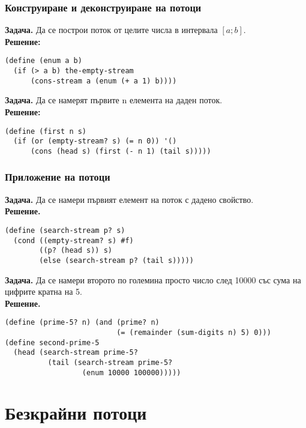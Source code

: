\documentclass{beamer}
\begin{document}
\begin{frame}[fragile]
  \frametitle{Конструиране и деконструиране на потоци}

  \textbf{Задача.} Да се построи поток от целите числа в интервала $[a; b]$.\\
  \pause
  \textbf{Решение:}
\begin{verbatim}
(define (enum a b)
  (if (> a b) the-empty-stream
      (cons-stream a (enum (+ a 1) b))))
\end{verbatim}
  \pause
  \textbf{Задача.} Да се намерят първите n елемента на даден поток.\\
  \pause
  \textbf{Решение:}
\begin{verbatim}
(define (first n s)
  (if (or (empty-stream? s) (= n 0)) '()
      (cons (head s) (first (- n 1) (tail s)))))
\end{verbatim}
\end{frame}

\begin{frame}[fragile]
  \frametitle{Приложение на потоци}
  \small
  \textbf{Задача.} Да се намери първият елемент на поток с дадено свойство.\\
  \pause
  \textbf{Решение.}
\begin{verbatim}
(define (search-stream p? s)
  (cond ((empty-stream? s) #f)
        ((p? (head s)) s)
        (else (search-stream p? (tail s)))))
\end{verbatim}
  \pause
  \textbf{Задача.} Да се намери второто по големина просто число след 10000 със сума на цифрите кратна на 5.\\
  \pause
  \textbf{Решение.}
\begin{verbatim}
(define (prime-5? n) (and (prime? n)
                          (= (remainder (sum-digits n) 5) 0)))
(define second-prime-5
  (head (search-stream prime-5?
          (tail (search-stream prime-5?
                  (enum 10000 100000)))))
\end{verbatim}
\end{frame}

\section{Безкрайни потоци}
\end{document}
